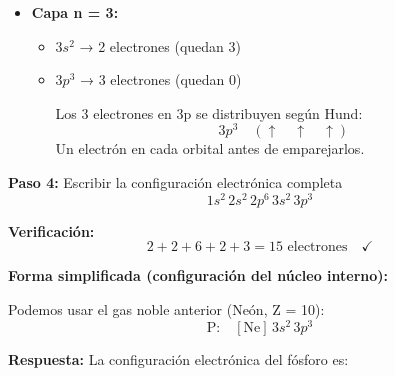 \begin{exercise}
\begin{solu}
\begin{itemize}
            \item \textbf{Capa n = 3:}
            \begin{itemize}
                \item \(3s^2\) → 2 electrones (quedan 3)
                \item \(3p^3\) → 3 electrones (quedan 0)

                Los 3 electrones en 3p se distribuyen según Hund:
                \[
                    3p^3 \quad (\uparrow \quad \uparrow \quad \uparrow)
                \]
                Un electrón en cada orbital antes de emparejarlos.
            \end{itemize}
        \end{itemize}

        \textbf{Paso 4:} Escribir la configuración electrónica completa
        \[
            \boxed{1s^2 \, 2s^2 \, 2p^6 \, 3s^2 \, 3p^3}
        \]

        \textbf{Verificación:}
        \[
            2 + 2 + 6 + 2 + 3 = 15 \text{ electrones} \quad \checkmark
        \]

        \textbf{Forma simplificada (configuración del núcleo interno):}

        Podemos usar el gas noble anterior (Neón, Z = 10):
        \[
            \text{P:} \quad [\text{Ne}] \, 3s^2 \, 3p^3
        \]

        \textbf{Respuesta:} La configuración electrónica del fósforo es: 
    \end{solu}
\end{exercise}

